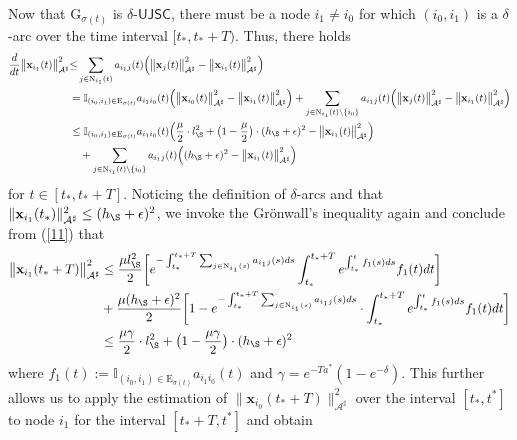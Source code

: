 \documentclass[a4paper, 11pt]{article}
\begin{document}
Now that   $\mathrm{G}_{\sigma(t)}$ is $\delta$-$\mathsf{UJSC}$, there must be a node $i_1\neq i_0$ for which $(i_0,i_1)$ is a $\delta$-arc over the time  interval $[t_\ast,t_\ast+T)$. Thus, there holds
\begin{align}\label{11}
\frac{d}{dt} \big\|\mathbf{x}_{i_1}(t)\big\|_{\mathcal{A}^\sharp}^2
&{\leq}   \sum_{j\in \mathrm{N}_{i_1}(t)}{a_{i_1j}(t)} \Big(\big\|\mathbf{x}_j(t)\big\|_{\mathcal{A}^\sharp}^2 - \big\|\mathbf{x}_{i_1}(t)\big\|_{\mathcal{A}^\sharp}^2  \Big)\nonumber\\
&= \mathbb{I}_{(i_0,i_1)\in\mathrm{E}_{\sigma(t)}}{a_{i_1i_0}(t)} \Big(\big\|\mathbf{x}_{i_0}(t)\big\|_{\mathcal{A}^\sharp}^2 - \big\|\mathbf{x}_{i_1}(t)\big\|_{\mathcal{A}^\sharp}^2  \Big)+\sum_{j\in \mathrm{N}_{i_1}(t)\setminus\{i_0\}}{a_{i_1j}(t)} \Big(\big\|\mathbf{x}_j(t)\big\|_{\mathcal{A}^\sharp}^2 - \big\|\mathbf{x}_{i_1}(t)\big\|_{\mathcal{A}^\sharp}^2  \Big)\nonumber\\
&\leq  \mathbb{I}_{(i_0,i_1)\in\mathrm{E}_{\sigma(t)}}{a_{i_1i_0}(t)} \Big( \frac{\mu}{2} \cdot l_\S^2+\big(1-\frac{\mu}{2}\big) \cdot(h_\S +\epsilon)^2 - \big\|\mathbf{x}_{i_1}(t)\big\|_{\mathcal{A}^\sharp}^2  \Big) \nonumber\\
&\ \ \ +\sum_{j\in \mathrm{N}_{i_1}(t)\setminus\{i_0\}}{a_{i_1j}(t)} \Big((h_\S +\epsilon)^2- \big\|\mathbf{x}_{i_1}(t)\big\|_{\mathcal{A}^\sharp}^2  \Big)
\end{align}
for $t\in[t_\ast,t_\ast+T]$. Noticing the definition of $\delta$-arcs and that $ \|\mathbf{x}_{i_1}(t_\ast)\|_{\mathcal{A}^\sharp}^2\leq (h_\S+\epsilon)^2$, we invoke the Gr\"{o}nwall's inequality again and conclude from (\ref{11}) that
\begin{align}
\big \|\mathbf{x}_{i_1}(t_\ast+T)\big\|_{\mathcal{A}^\sharp}^2
 &\leq \frac{\mu l_\S^2}{2} \bigg[e^{-\int_{t_\ast}^{t_\ast+T} \sum_{j\in \mathrm{N}_{i_1}(s)}{a_{i_1j}(s)}ds } \int_{t_\ast}^{t_\ast+T}e^{\int_{t_\ast}^{t}  f_1(s)ds } f_1(t) dt\bigg]\nonumber\\
&  +\frac{\mu (h_\S+\epsilon)^2}{2} \bigg[1-e^{-\int_{t_\ast}^{t_\ast+T} \sum_{j\in \mathrm{N}_{i_1}(s)}{a_{i_1j}(s)}ds }\cdot\int_{t_\ast}^{t_\ast+T}e^{\int_{t_\ast}^{t}  f_1(s)ds } f_1(t) dt\bigg]\nonumber\\
&\leq  \frac{\mu \gamma}{2} \cdot l_\S^2+\big(1-\frac{\mu\gamma}{2}\big) \cdot(h_\S +\epsilon)^2
\end{align}
 where $ f_1(t):=\mathbb{I}_{(i_0,i_1)\in\mathrm{E}_{\sigma(t)}}a_{i_1i_0}(t)$ and $\gamma=e^{- T a^\ast }(1-e^{-\delta}) $. This further allows us to apply the estimation of $\|\mathbf{x}_{i_0}(t_\ast+T)\|_{\mathcal{A}^\sharp}^2 $ over the interval $[t_\ast,t^\ast]$ to node $i_1$ for the interval $[t_\ast+T,t^\ast]$ and obtain
\end{document}
